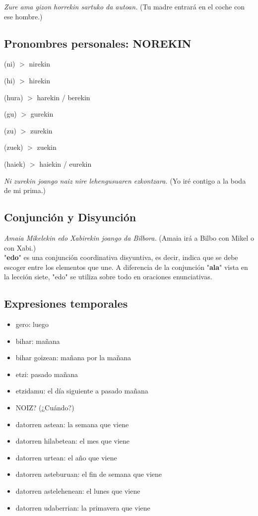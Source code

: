 \documentclass[11pt, a4paper]{article}
\begin{document}
\indent \textit{Zure ama gizon horrekin sartuko da autoan.} (Tu madre entrará en el coche con ese hombre.)\\

\subsection{Pronombres personales: NOREKIN}

\begin{itemize}
\begin{multicols}{2}
\item (ni) $>$ nirekin
\item (hi) $>$ hirekin
\item (hura) $>$ harekin / berekin\\
\item (gu) $>$ gurekin
\item (zu) $>$ zurekin
\item (zuek) $>$ zuekin
\item (haiek) $>$ haiekin / eurekin
\end{multicols}
\end{itemize}
\indent \textit{Ni zurekin joango naiz nire lehengusuaren ezkontzara.} (Yo iré contigo a la boda de mi prima.)

\subsection{Conjunci\'on y Disyunci\'on}
\indent \textit{Amaia Mikelekin edo Xabirekin joango da Bilbora.} (Amaia irá a Bilbo con Mikel o con Xabi.)\\
\noindent "\textbf{edo}" es una conjunción coordinativa disyuntiva, es decir, indica que se debe escoger entre los elementos que une. A diferencia de la conjunción "\textbf{ala}" vista en la lección siete, "edo" se utiliza sobre todo en oraciones enunciativas.

\subsection{Expresiones temporales}
\begin{itemize}
\item gero: luego
\item bihar: mañana
\item bihar goizean: mañana por la mañana
\item etzi: pasado mañana
\item etzidamu: el día siguiente a pasado mañana
\item NOIZ? (¿Cuándo?)
\item datorren astean: la semana que viene
\item datorren hilabetean: el mes que viene
\item datorren urtean: el año que viene
\item datorren asteburuan: el fin de semana que viene
\item datorren astelehenean: el lunes que viene
\item datorren udaberrian: la primavera que viene
\end{itemize}
\end{document}
